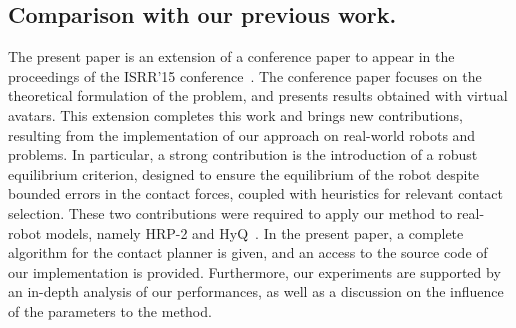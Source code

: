 \subsection*{Comparison with our previous work.}
The present paper is an extension of a conference paper to appear in the proceedings of the ISRR'15 conference~\citep{tonneauisrr15}.
The conference paper focuses on the theoretical formulation of the problem, and presents results obtained with virtual avatars.
This extension completes this work and brings new contributions, resulting from the implementation of our approach on real-world robots and problems.
In particular, a strong contribution is the introduction of a robust equilibrium criterion, designed to ensure the equilibrium of the robot despite bounded errors in the contact forces, coupled
with heuristics for relevant contact selection. These two contributions were required to apply our method to real-robot models, namely HRP-2 and HyQ~\citep{semini11hyqdesignjsce}.
In the present paper, a complete algorithm for the contact planner is given, and an access to the source code of our implementation is provided.
Furthermore, our experiments are supported by an in-depth analysis of our performances, as well as a discussion on the influence of the parameters to the method.

